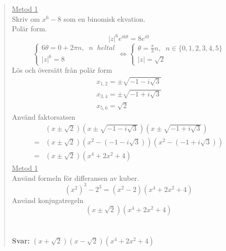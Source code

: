 \documentclass[a4paper]{article}
\begin{document}
	\begin{quotation}
		\noindent
		\underline{Metod 1} \\
		Skriv om  $x^6 - 8$  som en binomisk ekvation.\\
		Polär form.
		\[\left\lvert z\right\rvert^6e^{i6\theta} = 8e^{i0}  \]
		\[\begin{cases}
			6\theta = 0 + 2\pi n,\;\; n\;\;heltal\\
			\left\lvert z\right\rvert ^6 = 8
		\end{cases} \Leftrightarrow
		\begin{cases}
			\theta = \frac{\pi}{3} n,\;\; n\in \{0, 1, 2, 3, 4, 5\}\\
			\left\lvert z\right\rvert = \sqrt{2}
		\end{cases}\]
		Lös och översätt från polär form
		\begin{equation*}
			\begin{array}{l}
			x_{1,2}=\pm \sqrt{-1-i \sqrt{3}} \\
			x_{3,4}=\pm \sqrt{-1+i \sqrt{3}} \\
			x_{5,6}=\sqrt{2}
			\end{array}
			\end{equation*}
			Använd faktorsatsen
			\begin{equation*}
				\begin{aligned}
				&(x \pm \sqrt{2})\left(x\pm \sqrt{-1-i \sqrt{3}}\right)\left(x \pm \sqrt{-1+i \sqrt{3}}\right) \\
				=&(x \pm \sqrt{2})\left(x^{2}-(-1-i \sqrt{3})\right)\left(x^{2}-(-1+i \sqrt{3})\right) \\
				=&(x \pm \sqrt{2})\left(x^{4}+2 x^{2}+4\right)
				\end{aligned}
			\end{equation*}
			\underline{Metod 1} \\
			Använd formeln för differansen av kuber.\\
			\begin{equation*}
				\left(x^{2}\right)^{3}-2^{3}=\left(x^{2}-2\right)\left(x^{4}+2 x^{2}+4\right)
			\end{equation*}
			Använd konjugatregeln
			\begin{equation*}
				(x \pm \sqrt{2})\left(x^{4}+2 x^{2}+4\right)
			\end{equation*}
		\\ \\
		\textbf{Svar:} $(x + \sqrt{2})(x - \sqrt{2})\left(x^{4}+2 x^{2}+4\right)$
	\end{quotation}
	
\end{document}
